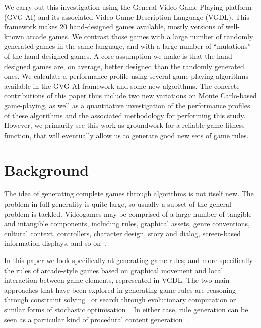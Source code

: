 \documentclass{llncs}
\begin{document}
We carry out this investigation using the General Video Game Playing platform (GVG-AI) and its associated Video Game Description Language (VGDL). This framework makes 20 hand-designed games available, mostly versions of well-known arcade games. We contrast those games with a large number of randomly generated games in the same language, and with a large number of ``mutations'' of the hand-designed games. A core assumption we make is that the hand-designed games are, on average, better designed than the randomly generated ones. We calculate a performance profile using several game-playing algorithms available in the GVG-AI framework and some new algorithms. The concrete contributions of this paper thus include two new variations on Monte Carlo-based game-playing, as well as a quantitative investigation of the performance profiles of these algorithms and the associated methodology for performing this study. However, we primarily see this work as groundwork for a reliable game fitness function, that will eventually allow us to generate good new sets of game rules.


\section{Background}
The idea of generating complete games through algorithms is not itself new. The problem in full generality is quite large, so usually a subset of the general problem is tackled. Videogames may be comprised of a large number of tangible and intangible components, including rules, graphical assets, genre conventions, cultural context, controllers, character design, story and dialog, screen-based information displays, and so on~\cite{cook2014angelina,liapis2014creativity,nelson2007automated}.

In this paper we look specifically at generating game rules; and more specifically the rules of arcade-style games based on graphical movement and local interaction between game elements, represented in VGDL. The two main approaches that have been explored in generating game rules are reasoning through constraint solving~\cite{smith2010variations} or search through evolutionary computation or similar forms of stochastic optimisation~\cite{togelius2008experiment,browne2008automated,font2013towards}. In either case, rule generation can be seen as a particular kind of procedural content generation~\cite{pcgbook:ch6}.
\end{document}
